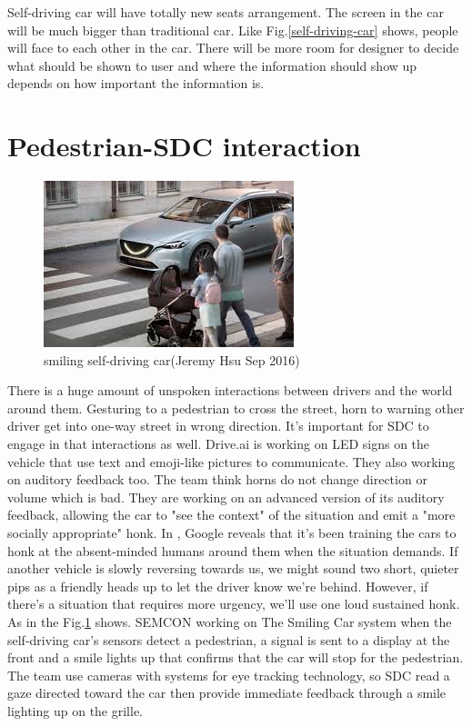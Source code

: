 \documentclass[a4paper, 10pt, conference]{ieeeconf}      %
\begin{document}
Self-driving car will have totally new seats arrangement. The screen in the car will be much bigger than traditional car. Like Fig.\ref{self-driving-car} shows, people will face to each other in the car. There will be more room for designer to decide what should be shown to user and where the information should show up depends on how important the information is.


\section{Pedestrian-SDC interaction}

\begin{figure}
    \centering
    \includegraphics[scale=0.8]{smilecar.jpg}
    \caption{smiling self-driving car(Jeremy Hsu Sep 2016)}
    \label{smile car}
\end{figure}

There is a huge amount of unspoken interactions between drivers and the world around them. Gesturing to a pedestrian to cross the street, horn to warning other driver get into one-way street in wrong direction. It’s important for SDC to engage in that interactions as well. Drive.ai is working on LED signs on the vehicle that use text and emoji-like pictures to communicate. They also working on auditory feedback too. The team think horns do not change direction or volume which is bad. They are working on an advanced version of its auditory feedback, allowing the car to "see the context" of the situation and emit a "more socially appropriate" honk. In \cite{google}, Google reveals that it's been training the cars to honk at the absent-minded humans around them when the situation demands. If another vehicle is slowly reversing towards us, we might sound two short, quieter pips as a friendly heads up to let the driver know we're behind. However, if there's a situation that requires more urgency, we'll use one loud sustained honk\cite{google}. As in the Fig.\ref{smile car} shows. SEMCON working on The Smiling Car system when the self-driving car’s sensors detect a pedestrian, a signal is sent to a display at the front and a smile lights up that confirms that the car will stop for the pedestrian. The team use cameras with systems for eye tracking technology, so SDC read a gaze directed toward the car then provide immediate feedback through a smile lighting up on the grille.
\end{document}
